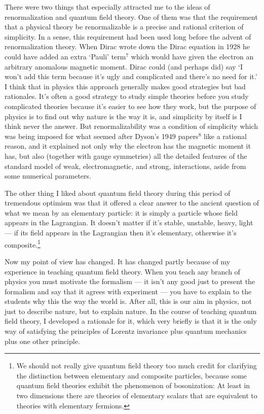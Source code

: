 \documentclass[12pt]{article}
\def\fnote#1#2{\begingroup\def\thefootnote{#1}\footnote{#2}
\endgroup}
\begin{document}
There were two things that especially attracted me to the
ideas of renormalization and quantum field theory.  One of
them was that the requirement that a physical theory be
renormalizable is a precise and rational criterion of
simplicity.  In a sense, this requirement had been used long
before the advent of renormalization theory.  When Dirac
wrote down the Dirac equation in 1928 he could have added an
extra `Pauli' term$^7$ which would have given the electron
an
arbitrary anomalous magnetic moment.  Dirac could (and
perhaps did) say `I won't add this term because it's ugly
and complicated and there's no need for it.'   I think that
in physics this approach generally makes good strategies but
bad rationales.  It's often a good strategy to study simple
theories before you study complicated theories because it's
easier to see how they work, but the purpose of physics is
to find out why nature is the way it is, and simplicity by
itself is I think never the answer.  But renormalizability
was a condition of simplicity which was being imposed for
what seemed after Dyson's 1949 papers$^8$ like a rational
reason, and it explained not only why the electron has the
magnetic moment it has, but also (together with gauge
symmetries) all the detailed features of the standard model
of weak, electromagnetic, and strong, interactions, aside
from some numerical parameters.

The other thing I liked about quantum field theory during
this period of tremendous optimism was that it offered a
clear answer to the ancient question of what we mean by an
elementary particle: it is simply a particle whose field
appears in the Lagrangian. It doesn't matter if it's stable,
unstable, heavy, light --- if its field appears in the
Lagrangian then it's elementary, otherwise it's
composite.\fnote{***}{We should not really give quantum
field
theory too much credit for clarifying the distinction
between elementary and composite particles, because some
quantum field theories exhibit the phenomenon of
bosonization:  At least in two dimensions there are theories
of elementary scalars that are equivalent to theories with
elementary fermions.}

Now my point of view has changed.  It has changed partly
because of my  experience in teaching quantum field theory.
When you teach any branch of physics you must motivate the
formalism --- it isn't any good just to present the
formalism and say that it agrees with experiment --- you
have to explain to the students why this the way the world
is.  After all, this is our aim in physics, not just to
describe nature, but to explain nature.  In the course of
teaching quantum field theory, I developed a rationale for
it, which very briefly is that it is the only way of
satisfying the principles of Lorentz invariance plus quantum
mechanics plus one other principle.
\end{document}
